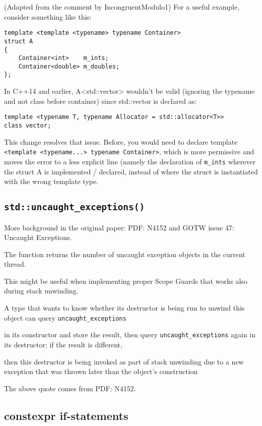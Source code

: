 (Adapted from the comment by IncongruentModulo1) For a useful example, consider something like this:

\begin{verbatim}
template <template <typename> typename Container>
struct A
{
    Container<int>    m_ints;
    Container<double> m_doubles;
};
\end{verbatim}

In C++14 and earlier, A<std::vector> wouldn’t be valid (ignoring the typename and not class before container) since std::vector is declared as:

\begin{verbatim}
template <typename T, typename Allocator = std::allocator<T>> 
class vector;
\end{verbatim}

This change resolves that issue. Before, you would need to declare template \texttt{<template <typename...> typename Container>}, which is more permissive and moves the error to a less explicit line (namely the declaration of \texttt{m_ints} wherever the struct A is implemented / declared, instead of where the struct is instantiated with the wrong template type.

\subsection{\texttt{std::uncaught_exceptions()}}

More background in the original paper: PDF: N4152 and GOTW issue 47: Uncaught Exceptions.

The function returns the number of uncaught exception objects in the current thread.

This might be useful when implementing proper Scope Guards that works also during stack unwinding.

A type that wants to know whether its destructor is being run to unwind this object can query \texttt{uncaught_exceptions} 

in its constructor and store the result, then query \texttt{uncaught_exceptions} again in its destructor; if the result is different, 

then this destructor is being invoked as part of stack unwinding due to a new exception that was thrown later than the object’s construction

The above quote comes from PDF: N4152.

\subsection{constexpr if-statements}

